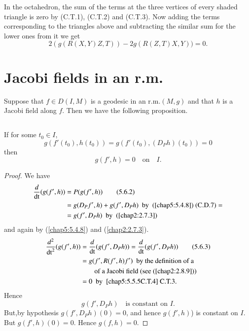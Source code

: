 In \pageoriginale the octahedron, the sum of the terms at the three
vertices of every shaded triangle is zero by (C.T.1), (C.T.2) and
(C.T.3). Now adding the terms corresponding to the triangles above and
subtracting the similar sum for the lower ones from it we get
$$
2(g(R(X,Y)Z,T))-2g(R(Z,T)X,Y))=0.
$$

\section{Jacobi fields in an r.m.}\label{chap5:sec6}

Suppose that $f\in D(I,M)$ is a geodesic in an r.m.\@ $(M,g)$ and that
$h$ is a Jacobi field along $f$. Then we have the following
proposition.

\subsection{}\label{chap5:5.6.1}

\begin{prop*}
If for some $t_{0}\in I$,
$$
g(f'(t_{0}),h(t_{0}))=g(f'(t_{0}),(D_{P}h)(t_{0}))=0
$$
then
$$
g(f',h)=0\quad\text{on}\quad I.
$$
\end{prop*}

\begin{proof}
We have
\begin{align*}
\frac{d}{\operatorname{dt}}(g(f',h)) &= P(g(f',h))\tag{5.6.2}\label{chap5:5.6.2}\\
&= g(D_{P}f',h)+g(f',D_{P}h)\text{ \ by \ (\ref{chap5:5.4.8}) (C.D.7)}
=\\
&= g(f',D_{P}h)\text{ \ by \ (\ref{chap2:2.7.3})} 
\end{align*}
and again by (\ref{chap5:5.4.8})  and (\ref{chap2:2.7.3}).
\begin{align*}
\frac{d^{2}}{\operatorname{dt}^{2}}(g(f',h)) &=
\frac{d}{\operatorname{dt}}(g(f',D_{P}h))=\frac{d}{\operatorname{dt}}(g(f',D_{P}h))\tag{5.6.3}\label{chap5:5.6.3}\\
&= g(f',R(f',h)f')\text{ \  by the definition of a}\\
&\qquad \text{of a Jacobi field (see (\ref{chap2:2.8.9}))}\\
&= 0\text{ \  by \ \eqref{chap5:5.5.5C.T.4} C.T.3.}
\end{align*}
Hence
$$
g(f',D_{P}h)\quad\text{is constant on $I$.}
$$
But,\pageoriginale by hypothesis $g(f',D_{P}h)(0)=0$, and hence
$g(f',h)$) is constant on $I$. But $g(f',h)(0)=0$. Hence $g(f,h)=0$.
\end{proof}

\setcounter{subsection}{3}


